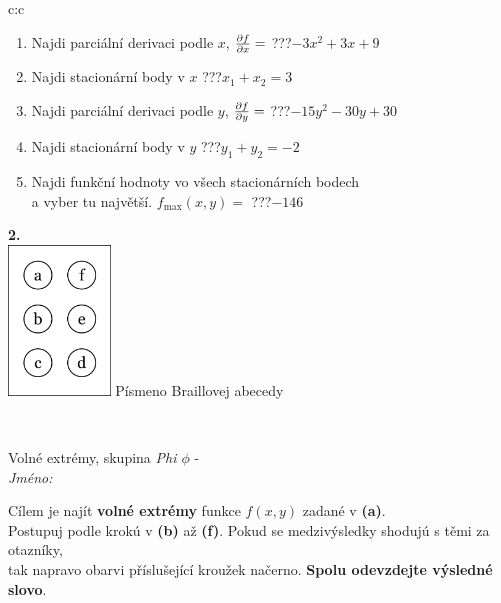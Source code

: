 \documentclass[10pt]{report}
\begin{document}
\begin{tabular}{c:c}
\begin{minipage}[c][104.5mm][t]{0.5\linewidth}
\begin{center}
\begin{minipage}{0.79\linewidth}
\begin{center}
\begin{varwidth}{\linewidth}
\begin{enumerate}
\item Najdi parciální derivaci podle $x$, $\pdv{f}{x}=$\quad \dotfill\; ???\;\dotfill \quad $-3x^2+3x+9$
\item Najdi stacionární body v $x$\quad \dotfill\; ???\;\dotfill \quad $x_1+x_2=3$
\item Najdi parciální derivaci podle $y$, $\pdv{f}{y}=$\quad \dotfill\; ???\;\dotfill \quad $-15y^2-30y+30$
\item Najdi stacionární body v $y$\quad \dotfill\; ???\;\dotfill \quad $y_1+y_2=-2$
\item Najdi funkční hodnoty vo všech stacionárních bodech \\ \phantom{xxxxxx} a vyber tu najvětší. $f_{\text{max}}(x,y)=$\quad \dotfill\; ???\;\dotfill \quad $-146$
\end{enumerate}
\end{varwidth}
\end{center}
\end{minipage}
\begin{minipage}{0.20\linewidth}
\begin{center}
{\Huge\bfseries 2.} \\[2mm]
\includegraphics[height=40mm]{../images/braille.png}
{\small Písmeno Braillovej abecedy}
\end{center}
\end{minipage}
\end{center}
\end{minipage}
\\ \hdashline
\begin{minipage}[c][104.5mm][t]{0.5\linewidth}
\begin{center}
\vspace{7mm}
{\huge Volné extrémy, skupina \textit{Phi $\phi$} -}\\[5mm]
\textit{Jméno:}\phantom{xxxxxxxxxxxxxxxxxxxxxxxxxxxxxxxxxxxxxxxxxxxxxxxxxxxxxxxxxxxxxxxxx}\\[5mm]
\begin{minipage}{0.95\linewidth}
\begin{center}
Cílem je najít \textbf{volné extrémy} funkce $f(x,y)$ zadané v \textbf{(a)}.\\Postupuj podle krokú v \textbf{(b)} až \textbf{(f)}. Pokud se medzivýsledky shodujú s těmi za otazníky,\\tak napravo obarvi příslušející kroužek načerno. \textbf{Spolu odevzdejte výsledné slovo}.

\end{center}
\end{minipage}
\end{center}
\end{minipage}
\end{tabular}
\end{document}

